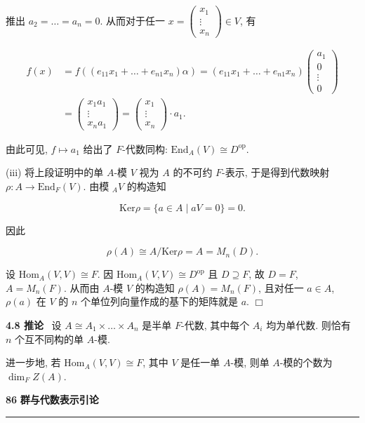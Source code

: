 \documentclass[11pt,a4paper]{article}
\begin{document}
推出 $a_2 = \dots = a_n = 0$. 从而对于任一 $x = \begin{pmatrix} x_1 \\ \vdots \\ x_n \end{pmatrix} \in V$, 有

$$
\begin{aligned}
f(x) &= f((e_{11}x_1 + \dots + e_{n1}x_n)\alpha) = (e_{11}x_1 + \dots + e_{n1}x_n) \begin{pmatrix} a_1 \\ 0 \\ \vdots \\ 0 \end{pmatrix} \\
&= \begin{pmatrix} x_1 a_1 \\ \vdots \\ x_n a_1 \end{pmatrix}
= \begin{pmatrix} x_1 \\ \vdots \\ x_n \end{pmatrix} \cdot a_1.
\end{aligned}
$$

由此可见, $f \mapsto a_1$ 给出了 $F$-代数同构: $\mathrm{End}_A(V) \cong D^{\mathrm{op}}$.

(iii) 将上段证明中的单 $A$-模 $V$ 视为 $A$ 的不可约 $F$-表示, 于是得到代数映射 $\rho : A \to \mathrm{End}_F(V)$. 由模 ${}_A V$ 的构造知

$$
\mathrm{Ker}\rho = \{ a \in A \mid aV = 0 \} = 0.
$$

因此

$$
\rho(A) \cong A/\mathrm{Ker}\rho = A = M_n(D).
$$

设 $\mathrm{Hom}_A(V, V) \cong F$. 因 $\mathrm{Hom}_A(V, V) \cong D^{\mathrm{op}}$ 且 $D \supseteq F$, 故 $D=F$, $A = M_n(F)$. 从而由 $A$-模 $V$ 的构造知 $\rho(A) = M_n(F)$, 且对任一 $a \in A$, $\rho(a)$ 在 $V$ 的 $n$ 个单位列向量作成的基下的矩阵就是 $a$. \hfill $\Box$

\vspace{0.5em}
\textbf{4.8 推论} \ 设 $A \cong A_1 \times \dots \times A_n$ 是半单 $F$-代数, 其中每个 $A_i$ 均为单代数. 则恰有 $n$ 个互不同构的单 $A$-模.

进一步地, 若 $\mathrm{Hom}_A(V, V) \cong F$, 其中 $V$ 是任一单 $A$-模, 则单 $A$-模的个数为 $\dim_F Z(A)$.

\newpage
\noindent \textbf{86} \hfill \textbf{群与代数表示引论}
\vspace{0.5em} \hrule \vspace{1.5em}
\end{document}
